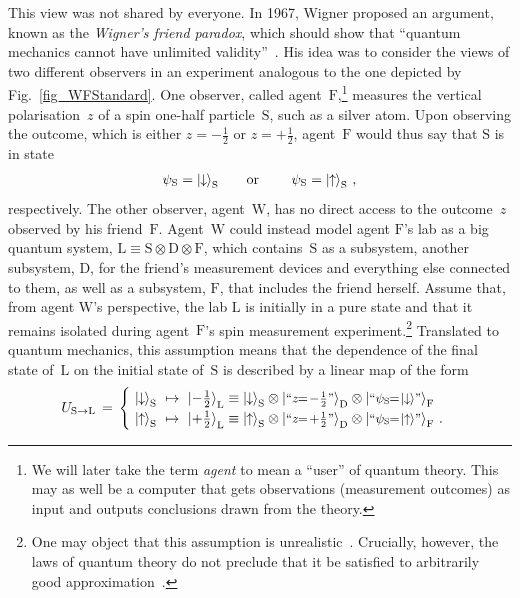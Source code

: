 \documentclass[12pt]{article}
\theoremstyle{mystyle}
\theoremstyle{definition}
\newcommand*{\ket}[1]{{| #1 \rangle}}
\newcommand*{\Friend}{\mathrm{F}}
\newcommand*{\Lab}{\mathrm{L}}
\newcommand*{\Wigner}{\mathrm{W}}
\newcommand*{\Spin}{\mathrm{S}}
\newcommand*{\spinup}{\ket{{\hspace{-0.1ex}\uparrow\hspace{-0.1ex}}}}
\newcommand*{\spindown}{\ket{{\hspace{-0.1ex}\downarrow\hspace{-0.1ex}}}}
\newcommand*{\sminus}{{\textstyle - \frac{1}{2}}}
\newcommand*{\splus}{{\textstyle + \frac{1}{2}}}
\begin{document}
This view was not shared by everyone.  In 1967, Wigner proposed an argument, known as the \emph{Wigner's friend paradox}, which should show that  ``quantum mechanics cannot have unlimited validity''~\cite{Wigner67}. His idea was to consider the views of two different observers  in an experiment analogous to the one depicted by Fig.~\ref{fig_WFStandard}. One observer, called agent~$\Friend$,\footnote{We will later take the term \emph{agent}  to mean a ``user'' of quantum theory. This may as well be a computer that gets observations (measurement outcomes) as input and outputs conclusions drawn from the theory.} measures the vertical polarisation~$z$ of a spin one-half particle~$\Spin$, such as a silver atom.  Upon observing the outcome, which is either  $z=\sminus$ or $z=\splus$, agent~$\Friend$ would thus say that  $\Spin$ is  in state
\begin{align} \label{eq_stateFriend}
  \psi_{\Spin} = \spindown_{\Spin} \qquad \text{or } \qquad \psi_{\Spin} = \spinup_{\Spin}   \ ,
\end{align} 
respectively.  The other observer, agent~$\Wigner$,   has no direct access to the outcome~$z$ observed by his friend~$\Friend$. Agent~$\Wigner$  could instead model agent $\Friend$'s lab  as a big quantum system, $\Lab \equiv \Spin \otimes \mathrm{D} \otimes \mathrm{F}$, which contains~$\Spin$ as a subsystem, another subsystem, $\mathrm{D}$, for the friend's measurement devices  and everything else connected to them, as well as a subsystem, $\mathrm{F}$, that includes the friend herself. Assume that, from agent $\Wigner$'s perspective, the lab $\Lab$ is initially in a pure state and that it remains isolated during agent~$\Friend$'s spin measurement experiment.\footnote{One may object that this assumption is unrealistic~\cite{Hepp72}. Crucially, however, the laws of quantum theory do not preclude that it be satisfied to arbitrarily good approximation~\cite{Bell75}.}  Translated to quantum mechanics, this assumption means that the  dependence of the final state of~$\Lab$ on the initial state of~$\Spin$ is described by a linear map  of the form 
\begin{align} \label{eq_Labstate}
   U_{\Spin \to \Lab} \, = \, \begin{cases}  \, \, \spindown_{\Spin} \, \,  \mapsto  \, \,  \ket{\sminus}_{\Lab}  \equiv \spindown_{\Spin} \otimes \ket{\text{\footnotesize ``$z \!\! = \! \sminus$''}}_{\mathrm{D}} \otimes \ket{\text{\footnotesize ``$\psi_{\Spin} \!\! = \! \spindown$''}}_{\mathrm{F}}  \\ 
   \, \, \spinup_{\Spin} \,  \, \mapsto \, \,  \ket{\splus}_{\Lab} \equiv \spinup_{\Spin} \otimes \ket{\text{\footnotesize ``$z \!\! = \! \splus$''}}_{\mathrm{D}} \otimes \ket{\text{\footnotesize ``$\psi_{\Spin} \!\!= \! \spinup$''}}_{\mathrm{F}} \ .   \end{cases} 
\end{align} 
\end{document}
